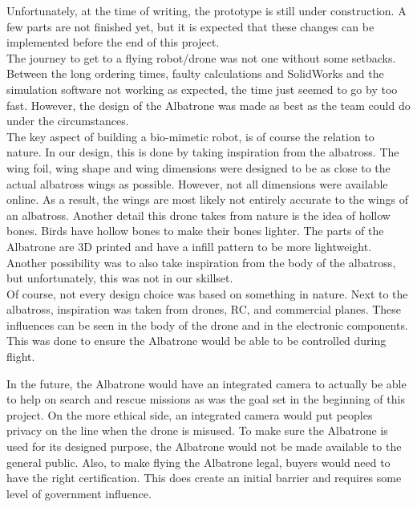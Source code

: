 Unfortunately, at the time of writing, the prototype is still under construction. A few parts are not finished yet, but it is expected that these changes can be implemented before the end of this project. \\

The journey to get to a flying robot/drone was not one without some setbacks. Between the long ordering times, faulty calculations and SolidWorks and the simulation software not working as expected, the time just seemed to go by too fast. However, the design of the Albatrone was made as best as the team could do under the circumstances.\\

The key aspect of building a bio-mimetic robot, is of course the relation to nature. In our design, this is done by taking inspiration from the albatross. The wing foil, wing shape and wing dimensions were designed to be as close to the actual albatross wings as possible. However, not all dimensions were available online. As a result, the wings are most likely not entirely accurate to the wings of an albatross. Another detail this drone takes from nature is the idea of hollow bones. Birds have hollow bones to make their bones lighter. The parts of the Albatrone are 3D printed and have a infill pattern to be more lightweight. Another possibility was to also take inspiration from the body of the albatross, but unfortunately, this was not in our skillset.\\ 

Of course, not every design choice was based on something in nature. Next to the albatross, inspiration was taken from drones, RC, and commercial planes. These influences can be seen in the body of the drone and in the electronic components. This was done to ensure the Albatrone would be able to be controlled during flight.

In the future, the Albatrone would have an integrated camera to actually be able to help on search and rescue missions as was the goal set in the beginning of this project. On the more ethical side, an integrated camera would put peoples privacy on the line when the drone is misused. To make sure the Albatrone is used for its designed purpose, the Albatrone would not be made available to the general public. Also, to make flying the Albatrone legal, buyers would need to have the right certification. This does create an initial barrier and requires some level of government influence.\\

